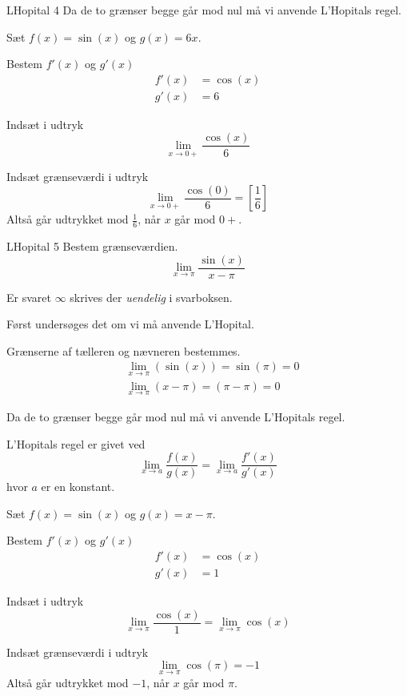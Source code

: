 \documentclass{article}
\begin{document}
\begin{exercise}{LHopital 4}
\hint
Da de to grænser begge går mod nul må vi  anvende L'Hopitals regel. 

\hint
Sæt $f(x) = \sin(x)$ og $g(x) = 6x$. 

\hint
Bestem $f'(x)$ og $g'(x)$
\begin{align*}
	f'(x) &=  \cos(x) \\
	g'(x) &= 6
\end{align*}

\hint
Indsæt i udtryk
\[
\lim_{x \to 0+} \frac{\cos(x)}{6} 
\]

\hint
Indsæt grænseværdi i udtryk
\[
\lim_{x \to 0+} \frac{\cos(0)}{6}  = \left[ \frac{1}{6}  \right] 
\]
Altså går udtrykket mod $\frac{1}{6}$, når $x$ går mod $0+$. 

\end{exercise}

\begin{exercise}{LHopital 5}
Bestem grænseværdien.
\[
\lim_{x \to \pi} \frac{\sin(x)}{x - \pi}
\] 

Er svaret $\infty$ skrives der \emph{uendelig} i svarboksen.


\hint
Først undersøges det om vi må anvende L'Hopital.

\hint
Grænserne af tælleren og nævneren bestemmes.
\begin{align*}
	&\lim_{x \to \pi} (\sin(x)) = \sin(\pi) = 0 \\
	&\lim_{x \to \pi} (x - \pi) = (\pi - \pi) = 0
\end{align*}

\hint
Da de to grænser begge går mod nul må vi  anvende L'Hopitals regel. 

\hint
L'Hopitals regel er givet ved
\[
\lim_{x \to a} \frac{f(x)}{g(x)} = \lim_{x \to a} \frac{f'(x)}{g'(x)} 
\]
hvor $a$  er en konstant.

\hint
Sæt $f(x) = \sin(x)$ og $g(x) = x - \pi$. 

\hint
Bestem $f'(x)$ og $g'(x)$
\begin{align*}
	f'(x) &= \cos(x) \\
	g'(x) &= 1
\end{align*}

\hint
Indsæt i udtryk
\[
\lim_{x \to \pi} \frac{\cos(x)}{1}  = \lim_{x \to \pi} \cos(x)
\]

\hint
Indsæt grænseværdi i udtryk
\[
\lim_{x \to \pi} \cos(\pi) = -1
\]
Altså går udtrykket mod $-1$, når $x$ går mod $\pi$. 

\end{exercise}
\end{document}
